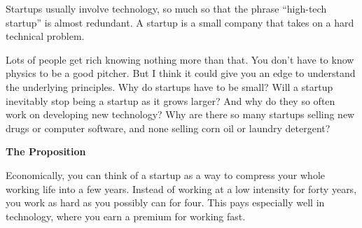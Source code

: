 \documentclass[12pt]{book}
\begin{document}
Startups usually involve technology, so much so that the phrase
``high-tech startup'' is almost redundant. A startup is a small company
that takes on a hard technical problem.

Lots of people get rich knowing nothing more than that. You don't have
to know physics to be a good pitcher. But I think it could give you an
edge to understand the underlying principles. Why do startups have to be
small? Will a startup inevitably stop being a startup as it grows
larger? And why do they so often work on developing new technology? Why
are there so many startups selling new drugs or computer software, and
none selling corn oil or laundry detergent?

\textbf{The Proposition}

Economically, you can think of a startup as a way to compress your whole
working life into a few years. Instead of working at a low intensity for
forty years, you work as hard as you possibly can for four. This pays
especially well in technology, where you earn a premium for working
fast.
\end{document}
